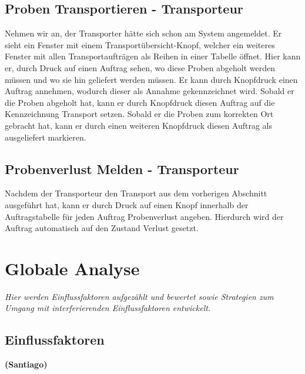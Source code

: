 \documentclass[enabledeprecatedfontcommands,fontsize=12pt,paper=a4,twoside]{scrartcl}
\begin{document}
\subsection{Proben Transportieren - Transporteur}

Nehmen wir an, der Transporter hätte sich schon am System angemeldet. Er sieht ein Fenster mit einem Transportübersicht-Knopf, welcher ein weiteres Fenster mit allen Transportaufträgen als Reihen in einer Tabelle öffnet. Hier kann er, durch Druck auf einen Auftrag sehen, wo diese Proben abgeholt werden müssen und wo sie hin geliefert werden müssen. 
Er kann durch Knopfdruck einen Auftrag annehmen, wodurch dieser als Annahme gekennzeichnet wird. Sobald er die Proben abgeholt hat, kann er durch Knopfdruck diesen Auftrag auf die Kennzeichnung Transport setzen. Sobald er die Proben zum korrekten Ort gebracht hat, kann er durch einen weiteren Knopfdruck diesen Auftrag als ausgeliefert markieren.

\subsection{Probenverlust Melden - Transporteur}

Nachdem der Transporteur den Transport aus dem vorherigen Abschnitt ausgeführt hat, kann er durch Druck auf einen Knopf innerhalb der Auftragstabelle für jeden Auftrag Probenverlust angeben. Hierdurch wird der Auftrag automatisch auf den Zustand Verlust gesetzt.


\section{Globale Analyse}

\label{sec:globale_analyse}

{\it Hier werden Einflussfaktoren aufgezählt und bewertet sowie Strategien
zum Umgang mit interferierenden Einflussfaktoren entwickelt.}

\subsection{Einflussfaktoren} \textbf{(Santiago)}
\\

\end{document}
